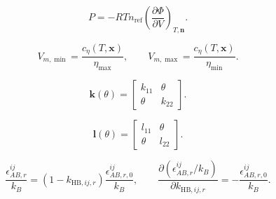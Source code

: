 \documentclass[11pt]{article}
\begin{document}
\begin{equation}
P=-RTn_{\mathrm{ref}}
\left(\frac{\partial\Phi}{\partial V}\right)_{T,\boldsymbol{n}}.
\label{eq:phase_pressure}
\end{equation}

\begin{equation}
V_{m,\min}=\frac{c_\eta(T,\boldsymbol{x})}{\eta_{\max}},
\qquad
V_{m,\max}=\frac{c_\eta(T,\boldsymbol{x})}{\eta_{\min}}.
\label{eq:packing_volume_bounds}
\end{equation}

\begin{equation}
\boldsymbol{k}(\theta)=
\begin{bmatrix}
k_{11}&\theta\\
\theta&k_{22}
\end{bmatrix}.
\label{eq:active_binary_interaction_mapping}
\end{equation}

\begin{equation}
\boldsymbol{l}(\theta)=
\begin{bmatrix}
l_{11}&\theta\\
\theta&l_{22}
\end{bmatrix}.
\label{eq:active_binary_size_interaction_mapping}
\end{equation}

\begin{equation}
\frac{\epsilon_{AB,r}^{ij}}{k_B}
=\left(1-k_{\mathrm{HB},ij,r}\right)
\frac{\epsilon_{AB,r,0}^{ij}}{k_B},
\qquad
\frac{\partial\left(\epsilon_{AB,r}^{ij}/k_B\right)}
{\partial k_{\mathrm{HB},ij,r}}
=-\frac{\epsilon_{AB,r,0}^{ij}}{k_B}.
\label{eq:cross_association_energy_correction}
\end{equation}
\end{document}
